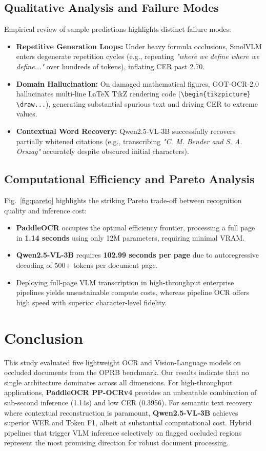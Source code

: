\documentclass[conference,10pt,a4paper]{IEEEtran}
\begin{document}
\subsection{Qualitative Analysis and Failure Modes}
Empirical review of sample predictions highlights distinct failure modes:
\begin{itemize}
    \item \textbf{Repetitive Generation Loops:} Under heavy formula occlusions, SmolVLM enters degenerate repetition cycles (e.g., repeating \textit{"where we define where we define..."} over hundreds of tokens), inflating CER past 2.70.
    \item \textbf{Domain Hallucination:} On damaged mathematical figures, GOT-OCR-2.0 hallucinates multi-line LaTeX TikZ rendering code (\texttt{\textbackslash begin\{tikzpicture\} \textbackslash draw...}), generating substantial spurious text and driving CER to extreme values.
    \item \textbf{Contextual Word Recovery:} Qwen2.5-VL-3B successfully recovers partially whitened citations (e.g., transcribing \textit{"C. M. Bender and S. A. Orszag"} accurately despite obscured initial characters).
\end{itemize}

\subsection{Computational Efficiency and Pareto Analysis}
Fig.~\ref{fig:pareto} highlights the striking Pareto trade-off between recognition quality and inference cost:
\begin{itemize}
    \item \textbf{PaddleOCR} occupies the optimal efficiency frontier, processing a full page in \textbf{1.14 seconds} using only 12M parameters, requiring minimal VRAM.
    \item \textbf{Qwen2.5-VL-3B} requires \textbf{102.99 seconds per page} due to autoregressive decoding of 500+ tokens per document page.
    \item Deploying full-page VLM transcription in high-throughput enterprise pipelines yields unsustainable compute costs, whereas pipeline OCR offers high speed with superior character-level fidelity.
\end{itemize}

\section{Conclusion}
This study evaluated five lightweight OCR and Vision-Language models on occluded documents from the OPRB benchmark. Our results indicate that no single architecture dominates across all dimensions. For high-throughput applications, \textbf{PaddleOCR PP-OCRv4} provides an unbeatable combination of sub-second inference (1.14s) and low CER (0.3956). For semantic text recovery where contextual reconstruction is paramount, \textbf{Qwen2.5-VL-3B} achieves superior WER and Token F1, albeit at substantial computational cost. Hybrid pipelines that trigger VLM inference selectively on flagged occluded regions represent the most promising direction for robust document processing.
\end{document}
